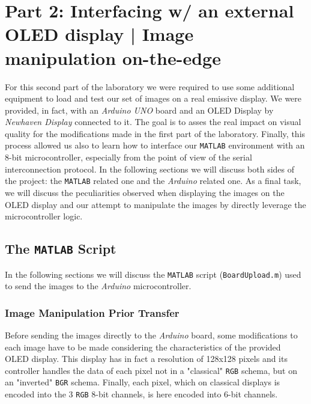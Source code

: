 \documentclass[a4paper]{article}
\begin{document}
            
%
\section{Part 2: Interfacing w/ an external OLED display | Image manipulation on-the-edge}
    For this second part of the laboratory we were required to use some additional equipment to load and test our set of images on a real emissive display. We were provided, in fact, with an \emph{Arduino UNO} board and an OLED Display by \emph{Newhaven Display} connected to it.
    The goal is to asses the real impact on visual quality for the modifications made in the first part of the laboratory. Finally, this process allowed us also to learn how to interface our \texttt{MATLAB} environment with an 8-bit microcontroller, especially from the point of view of the serial interconnection protocol.
    In the following sections we will discuss both sides of the project: the \texttt{MATLAB} related one and the \emph{Arduino} related one. As a final task, we will discuss the peculiarities observed when displaying the images on the OLED display and our attempt to manipulate the images by directly leverage the microcontroller logic.

    \subsection{The \texttt{MATLAB} Script}
        In the following sections we will discuss the \texttt{MATLAB} script (\texttt{BoardUpload.m}) used to send the images to the \emph{Arduino} microcontroller.

        \subsubsection{Image Manipulation Prior Transfer}
            Before sending the images directly to the \emph{Arduino} board, some modifications to each image have to be made considering the characteristics of the provided OLED display.
            This display has in fact a resolution of 128x128 pixels and its controller handles the data of each pixel not in a "classical" \texttt{RGB} schema, but on an "inverted" \texttt{BGR} schema. Finally, each pixel, which on classical displays is encoded into the 3 \texttt{RGB} 8-bit channels, is here encoded into 6-bit channels.
\end{document}

